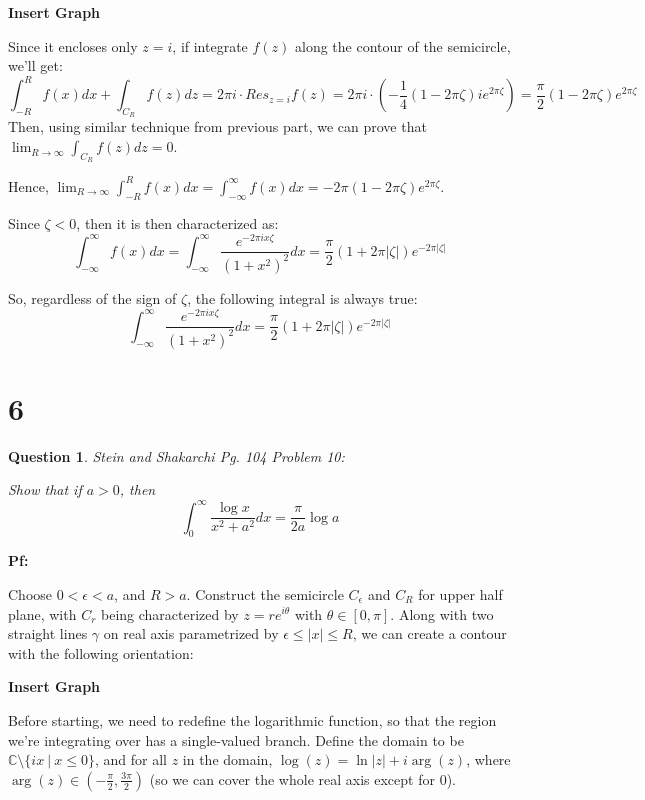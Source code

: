 \documentclass{article}
\newtheorem{question}{Question}
\begin{document}
\textbf{Insert Graph}

Since it encloses only $z=i$, if integrate $f(z)$ along the contour of the semicircle, we'll get:
$$\int_{-R}^{R}f(x)dx+\int_{C_R}f(z)dz = 2\pi i\cdot Res_{z=i}f(z)=2\pi i\cdot (-\frac{1}{4}(1-2\pi \zeta)ie^{2\pi \zeta}) = \frac{\pi}{2}(1-2\pi\zeta)e^{2\pi\zeta}$$
Then, using similar technique from previous part, we can prove that $\lim_{R\rightarrow\infty}\int_{C_R}f(z)dz = 0$.

Hence, $\lim_{R\rightarrow\infty}\int_{-R}^{R}f(x)dx = \int_{-\infty}^{\infty}f(x)dx = -2\pi(1-2\pi\zeta)e^{2\pi\zeta}$.

Since $\zeta<0$, then it is then characterized as:
$$\int_{-\infty}^{\infty}f(x)dx =\int_{-\infty}^{\infty}\frac{e^{-2\pi ix\zeta}}{(1+x^2)^2}dx = \frac{\pi}{2}(1+2\pi|\zeta|)e^{-2\pi|\zeta|}$$

So, regardless of the sign of $\zeta$, the following integral is always true:
$$\int_{-\infty}^{\infty}\frac{e^{-2\pi ix\zeta}}{(1+x^2)^2}dx = \frac{\pi}{2}(1+2\pi|\zeta|)e^{-2\pi|\zeta|}$$

\break

\section*{6}
\begin{myBox}[]{}
    \begin{question}
        Stein and Shakarchi Pg. 104 Problem 10:

        Show that if $a>0$, then
        $$\int_{0}^{\infty}\frac{\log x}{x^2+a^2}dx = \frac{\pi}{2a}\log a$$
    \end{question}
\end{myBox}

\textbf{Pf:}

Choose $0<\epsilon<a$, and $R>a$. Construct the semicircle $C_\epsilon$ and $C_R$ for upper half plane, with $C_r$ being characterized by $z=re^{i\theta}$ with $\theta\in[0,\pi]$.
Along with two straight lines $\gamma$ on real axis parametrized by $\epsilon\leq |x|\leq R$, we can create a contour with the following orientation:

\textbf{Insert Graph}

Before starting, we need to redefine the logarithmic function, so that the region we're integrating over has a single-valued branch.
Define the domain to be $\mathbb{C}\setminus\{ix\ |\ x\leq 0\}$, and for all $z$ in the domain, $\log(z)=\ln|z|+i\arg(z)$, where $\arg(z)\in (-\frac{\pi}{2},\frac{3\pi}{2})$ (so we can cover the whole real axis except for $0$).
\end{document}
